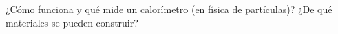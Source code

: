 \documentclass[./../main.tex]{subfiles}
\begin{document}
	\begin{exercise}
		¿Cómo funciona y qué mide un calorímetro (en física de partículas)? ¿De qué materiales se pueden construir?
	\end{exercise}
\end{document}

